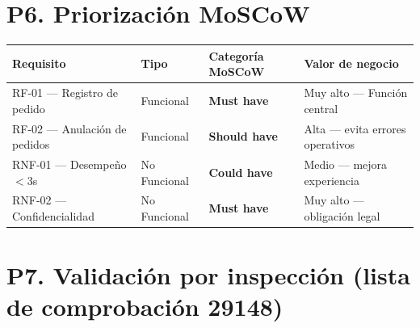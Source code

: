 \documentclass{article}
\begin{document}
\section{P6. Priorización MoSCoW}

\begin{table}[H]
\centering
\small
\begin{tabular}{|p{3.2cm}|p{2.2cm}|p{2.5cm}|p{5cm}|}
\hline
\rowcolor{lightblue}
\textbf{Requisito} & \textbf{Tipo} & \textbf{Categoría MoSCoW} & \textbf{Valor de negocio} \\
\hline
RF-01 — Registro de pedido
  & Funcional
  & \cellcolor{lightred}\textbf{Must have}
  & Muy alto — Función central \\
\hline
RF-02 — Anulación de pedidos
  & Funcional
  & \cellcolor{lightyellow}\textbf{Should have}
  & Alta — evita errores operativos \\
\hline
RNF-01 — Desempeño $<$3s
  & No Funcional
  & \cellcolor{lightgreen}\textbf{Could have}
  & Medio — mejora experiencia \\
\hline
RNF-02 — Confidencialidad
  & No Funcional
  & \cellcolor{lightred}\textbf{Must have}
  & Muy alto — obligación legal \\
\hline
\end{tabular}
\end{table}



\section{P7. Validación por inspección (lista de comprobación 29148)}
\end{document}
